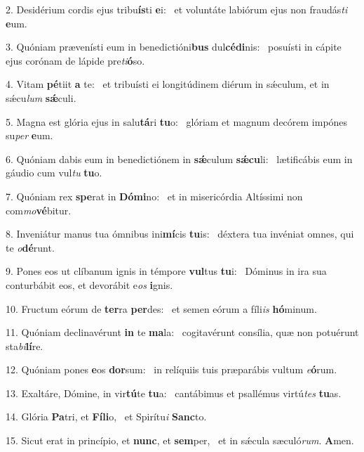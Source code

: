 2. Desidérium cordis ejus tribu\textbf{ís}ti \textbf{e}i: \ast\  et voluntáte labiórum ejus non fraudás\textit{ti} \textbf{e}um.\

3. Quóniam prævenísti eum in benedictióni\textbf{bus} dul\textbf{cé}\textbf{di}nis: \ast\  posuísti in cápite ejus corónam de lápide pre\textit{ti}\textbf{ó}so.\

4. Vitam \textbf{pé}tiit \textbf{a} te: \ast\  et tribuísti ei longitúdinem diérum in sǽculum, et in sǽcu\textit{lum} \textbf{sǽ}culi.\

5. Magna est glória ejus in salu\textbf{tá}ri \textbf{tu}o: \ast\  glóriam et magnum decórem impónes su\textit{per} \textbf{e}um.\

6. Quóniam dabis eum in benedictiónem in \textbf{sǽ}culum \textbf{sǽ}\textbf{cu}li: \ast\  lætificábis eum in gáudio cum vul\textit{tu} \textbf{tu}o.\

7. Quóniam rex \textbf{spe}rat in \textbf{Dó}\textbf{mi}no: \ast\  et in misericórdia Altíssimi non com\textit{mo}\textbf{vé}bitur.\

8. Inveniátur manus tua ómnibus ini\textbf{mí}cis \textbf{tu}is: \ast\  déxtera tua invéniat omnes, qui te \textit{o}\textbf{dé}runt.\

9. Pones eos ut clíbanum ignis in témpore \textbf{vul}tus \textbf{tu}i: \ast\  Dóminus in ira sua conturbábit eos, et devorábit e\textit{os} \textbf{i}gnis.\

10. Fructum eórum de \textbf{ter}ra \textbf{per}des: \ast\  et semen eórum a fíli\textit{is} \textbf{hó}minum.\

11. Quóniam declinavérunt \textbf{in} te \textbf{ma}la: \ast\  cogitavérunt consília, quæ non potuérunt sta\textit{bi}\textbf{lí}re.\

12. Quóniam pones \textbf{e}os \textbf{dor}sum: \ast\  in relíquiis tuis præparábis vultum \textit{e}\textbf{ó}rum.\

13. Exaltáre, Dómine, in vir\textbf{tú}te \textbf{tu}a: \ast\  cantábimus et psallémus virtú\textit{tes} \textbf{tu}as.\

14. Glória \textbf{Pa}tri, et \textbf{Fí}\textbf{li}o, \ast\  et Spirítu\textit{i} \textbf{Sanc}to.\

15. Sicut erat in princípio, et \textbf{nunc}, et \textbf{sem}per, \ast\  et in sǽcula sæculó\textit{rum}. \textbf{A}men.\

